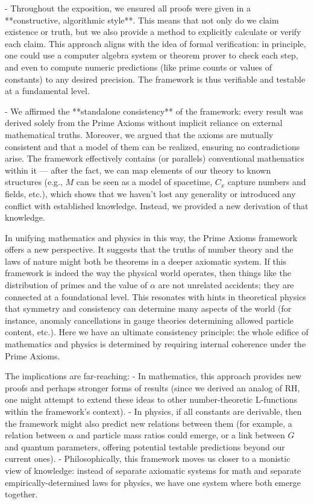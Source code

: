 \documentclass[11pt]{article}
\begin{document}
- Throughout the exposition, we ensured all proofs were given in a **constructive, algorithmic style**. This means that not only do we claim existence or truth, but we also provide a method to explicitly calculate or verify each claim. This approach aligns with the idea of formal verification: in principle, one could use a computer algebra system or theorem prover to check each step, and even to compute numeric predictions (like prime counts or values of constants) to any desired precision. The framework is thus verifiable and testable at a fundamental level.

- We affirmed the **standalone consistency** of the framework: every result was derived solely from the Prime Axioms without implicit reliance on external mathematical truths. Moreover, we argued that the axioms are mutually consistent and that a model of them can be realized, ensuring no contradictions arise. The framework effectively contains (or parallels) conventional mathematics within it — after the fact, we can map elements of our theory to known structures (e.g., $M$ can be seen as a model of spacetime, $C_x$ capture numbers and fields, etc.), which shows that we haven't lost any generality or introduced any conflict with established knowledge. Instead, we provided a new derivation of that knowledge.

In unifying mathematics and physics in this way, the Prime Axioms framework offers a new perspective. It suggests that the truths of number theory and the laws of nature might both be theorems in a deeper axiomatic system. If this framework is indeed the way the physical world operates, then things like the distribution of primes and the value of $\alpha$ are not unrelated accidents; they are connected at a foundational level. This resonates with hints in theoretical physics that symmetry and consistency can determine many aspects of the world (for instance, anomaly cancellations in gauge theories determining allowed particle content, etc.). Here we have an ultimate consistency principle: the whole edifice of mathematics and physics is determined by requiring internal coherence under the Prime Axioms.

The implications are far-reaching:
- In mathematics, this approach provides new proofs and perhaps stronger forms of results (since we derived an analog of RH, one might attempt to extend these ideas to other number-theoretic L-functions within the framework's context).
- In physics, if all constants are derivable, then the framework might also predict new relations between them (for example, a relation between $\alpha$ and particle mass ratios could emerge, or a link between $G$ and quantum parameters, offering potential testable predictions beyond our current ones).
- Philosophically, this framework moves us closer to a monistic view of knowledge: instead of separate axiomatic systems for math and separate empirically-determined laws for physics, we have one system where both emerge together.
\end{document}
